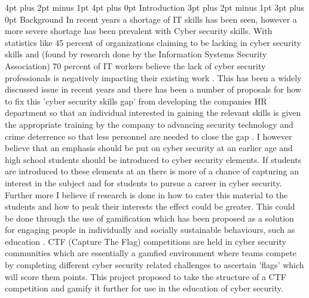 \documentclass[12pt,a4paper]{article}
\makeatletter
\renewcommand\subsection{\@startsection {subsection}{1}{2mm} %
                               {3pt plus 2pt minus 1pt} %
                               {3pt plus 0pt} %
                               {\normalfont\bfseries}}
\renewcommand\section{\@startsection {section}{1}{0mm} %
                               {4pt plus 2pt minus 1pt} %
                               {4pt plus 0pt} %
                               {\bfseries}}
\makeatother
\begin{document}
\section{Introduction} 
\subsection{Background}  
In recent years a shortage of IT skills has been seen, however a more severe shortage has been prevalent with Cyber security skills. With statistics like 45 percent of organizations claiming to be lacking in cyber security skills and (found by research done by the Information Systems Security Association) 70 percent of IT workers believe the lack of cyber security professionals is negatively impacting their existing work \cite{smith2018intelligent}. This has been a widely discussed issue in recent years and there has been a number of proposals for how to fix this 'cyber security skills gap' from developing the companies HR department so that an individual interested in gaining the relevant skills is given the appropriate training by the company to advancing security technology and crime deterrence so that less personnel are needed to close the gap \cite{cobb2016mind}. I however believe that an emphasis should be put on cyber security at an earlier age and high school students should be introduced to cyber security elements. If students are introduced to these elements at an there is more of a chance of capturing an interest in the subject and for  students to pursue a career in cyber security. Further more I believe if research is done in how to cater this material to the students and how to peak their interests the effect could be greater. This could be done through the use of gamification which has been proposed as a solution for engaging people in individually and socially sustainable behaviours, such as education \cite{su2015mobile}. CTF (Capture The Flag) competitions are held in cyber security communities which are essentially a gamfied environment where teams compete by completing different cyber security related challenges to ascertain 'flags' which will score them points. This project proposed to take the structure of a CTF competition and gamify it further for use in the education of cyber security.  
\end{document}
